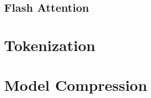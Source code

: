 
\section{Flash Attention}
\label{sec:transformer:flash_attention}


\chapter{Tokenization}
\label{ch:transformer:tokenization}

\chapter{Model Compression}
\label{ch:transformer:compression}


